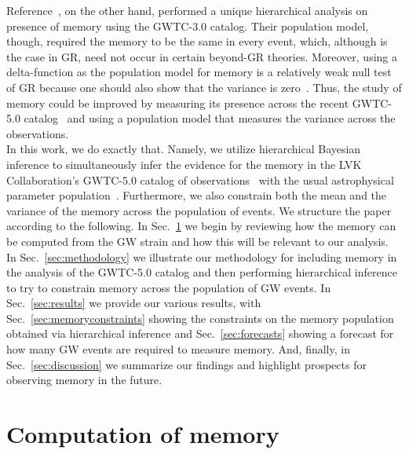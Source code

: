 \documentclass[aps,prd,reprint,twocolumn,10pt,eqsecnum,showpacs,nofootinbib,amsfonts,amssymb,amsmath,longbibliography,superscriptaddress,floatfix]{revtex4-1}
\begin{document}
Reference~\cite{Cheung:2024zow}, on the other hand, performed a unique hierarchical analysis on presence of memory using the GWTC-3.0 catalog. Their population model, though, required the memory to be the same in every event, which, although is the case in GR, need not occur in certain beyond-GR theories. Moreover, using a delta-function as the population model for memory is a relatively weak null test of GR because one should also show that the variance is zero~\cite{gelman2013bayesian}. Thus, the study of memory could be improved by measuring its presence across the recent GWTC-5.0 catalog~\cite{LIGOScientific:2026wfs} and using a population model that measures the variance across the observations.\\

In this work, we do exactly that. Namely, we utilize hierarchical Bayesian inference to simultaneously infer the evidence for the memory in the LVK Collaboration's GWTC-5.0 catalog of observations~\cite{LIGOScientific:2026wfs} with the usual astrophysical parameter population~\cite{LIGOScientific:2026ctl}. Furthermore, we also constrain both the mean and the variance of the memory across the population of events. We structure the paper according to the following. In Sec.~\ref{sec:memory} we begin by reviewing how the memory can be computed from the GW strain and how this will be relevant to our analysis. In Sec.~\ref{sec:methodology} we illustrate our methodology for including memory in the analysis of the GWTC-5.0 catalog and then performing hierarchical inference to try to constrain memory across the population of GW events. In Sec.~\ref{sec:results} we provide our various results, with Sec.~\ref{sec:memoryconstraints} showing the constraints on the memory population obtained via hierarchical inference and Sec.~\ref{sec:forecasts} showing a forecast for how many GW events are required to measure memory. And, finally, in Sec.~\ref{sec:discussion} we summarize our findings and highlight prospects for observing memory in the future.

\section{Computation of memory}
\label{sec:memory}
\end{document}

